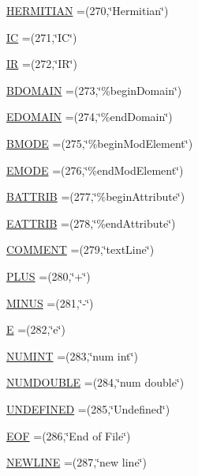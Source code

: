 \begin{DoxyCompactItemize}
\hyperlink{enumscanner_1_1Symbol_a54ab77d92fe2bc431bb8cb92f14ba893}{H\+E\+R\+M\+I\+T\+I\+AN} =(270,\char`\"{}Hermitian\char`\"{})
\item 
\hyperlink{enumscanner_1_1Symbol_adb3e5570967fd92fdd1954271afb106c}{IC} =(271,\char`\"{}IC\char`\"{})
\item 
\hyperlink{enumscanner_1_1Symbol_a8ab6664f58cbcb2473d37cbf9f60e926}{IR} =(272,\char`\"{}IR\char`\"{})
\item 
\hyperlink{enumscanner_1_1Symbol_ad6a62d8f6ff4dd72050d185f5ca284c4}{B\+D\+O\+M\+A\+IN} =(273,\char`\"{}\%begin\+Domain\char`\"{})
\item 
\hyperlink{enumscanner_1_1Symbol_ab42cf3cf57d25fb744a5dd5c9b63efc0}{E\+D\+O\+M\+A\+IN} =(274,\char`\"{}\%end\+Domain\char`\"{})
\item 
\hyperlink{enumscanner_1_1Symbol_a317540ed6fa5dd2a2d88bd2330f7885e}{B\+M\+O\+DE} =(275,\char`\"{}\%begin\+Mod\+Element\char`\"{})
\item 
\hyperlink{enumscanner_1_1Symbol_a2a421181e2f0e1c90ad0af595b6d8906}{E\+M\+O\+DE} =(276,\char`\"{}\%end\+Mod\+Element\char`\"{})
\item 
\hyperlink{enumscanner_1_1Symbol_a21607964d906cfc67cdb6d390919582b}{B\+A\+T\+T\+R\+IB} =(277,\char`\"{}\%begin\+Attribute\char`\"{})
\item 
\hyperlink{enumscanner_1_1Symbol_a78962cb98ddfb1e8e79c98f15c8f9643}{E\+A\+T\+T\+R\+IB} =(278,\char`\"{}\%end\+Attribute\char`\"{})
\item 
\hyperlink{enumscanner_1_1Symbol_a075212527a8bc8fba4907c4ba145107c}{C\+O\+M\+M\+E\+NT} =(279,\char`\"{}text\+Line\char`\"{})
\item 
\hyperlink{enumscanner_1_1Symbol_a5a82a1f927213af69169e22ee476fb55}{P\+L\+US} =(280,\char`\"{}+\char`\"{})
\item 
\hyperlink{enumscanner_1_1Symbol_ae7009205b3c1f781e1c88cb6009014ee}{M\+I\+N\+US} =(281,\char`\"{}-\/\char`\"{})
\item 
\hyperlink{enumscanner_1_1Symbol_a3fad7a9d1d48519d127a14c45c99b454}{E} =(282,\char`\"{}e\char`\"{})
\item 
\hyperlink{enumscanner_1_1Symbol_a42d90226a1f976a89daa673b88190c90}{N\+U\+M\+I\+NT} =(283,\char`\"{}num int\char`\"{})
\item 
\hyperlink{enumscanner_1_1Symbol_a4e4020d97e79ccd98f754f89e3017c1b}{N\+U\+M\+D\+O\+U\+B\+LE} =(284,\char`\"{}num double\char`\"{})
\item 
\hyperlink{enumscanner_1_1Symbol_ae8c4e968871042412d500b3278dcfda8}{U\+N\+D\+E\+F\+I\+N\+ED} =(285,\char`\"{}Undefined\char`\"{})
\item 
\hyperlink{enumscanner_1_1Symbol_a112ac5700480cd0695f81e027783a4e7}{E\+OF} =(286,\char`\"{}End of File\char`\"{})
\item 
\hyperlink{enumscanner_1_1Symbol_a824180c457dac27d762c237c0826520e}{N\+E\+W\+L\+I\+NE} =(287,\char`\"{}new line\char`\"{})
\end{DoxyCompactItemize}
